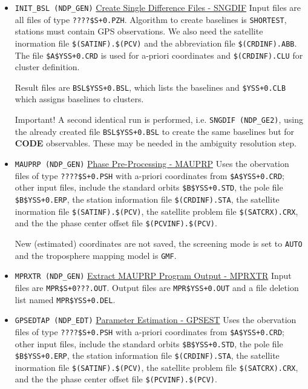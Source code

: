 \begin{itemize}
  \item \texttt{INIT\_BSL (NDP\_GEN)} \underline{Create Single Difference Files - SNGDIF}
    Input files are all files of type \texttt{????\$S+0.PZH}. Algorithm to create
    baselines is \texttt{SHORTEST}, stations must contain GPS observations. We
    also need the satellite inormation file \texttt{\$(SATINF).\$(PCV)} and the
    abbreviation file \texttt{\$(CRDINF).ABB}. The file \texttt{\$A\$YSS+0.CRD} is used
    for a-priori coordinates and \texttt{\$(CRDINF).CLU} for cluster definition.

    Result files are \texttt{BSL\$YSS+0.BSL}, which lists the baselines and
    \texttt{\$YSS+0.CLB} which assigns baselines to clusters.

    \begin{bclogo}[logo=\bcattention, couleurBarre=red, noborder=true, couleur=Peach]{Important!}
      A second identical run is performed, i.e. \texttt{SNGDIF (NDP\_GE2)}, using
      the already created file \texttt{BSL\$YSS+0.BSL} to create the same baselines
      but for \textbf{CODE} observables. These may be needed in the ambiguity
      resolution step.
    \end{bclogo}

  \item \texttt{MAUPRP (NDP\_GEN)} \underline{Phase Pre-Processing - MAUPRP}
    Uses the obervation files of type \texttt{????\$S+0.PSH} with a-priori coordinates
    from \texttt{\$A\$YSS+0.CRD}; other input files, include the standard orbits
    \texttt{\$B\$YSS+0.STD}, the pole file \texttt{\$B\$YSS+0.ERP}, the station
    information file \texttt{\$(CRDINF).STA}, the satellite inormation file
    \texttt{\$(SATINF).\$(PCV)}, the satellite problem file \texttt{\$(SATCRX).CRX},
    and the the phase center offset file \texttt{\$(PCVINF).\$(PCV)}.

    New (estimated) coordinates are not saved, the screening mode is set to
    \texttt{AUTO} and the troposphere mapping model is \texttt{GMF}.

  \item \texttt{MPRXTR (NDP\_GEN)} \underline{Extract MAUPRP Program Output - MPRXTR}
    Input files are \texttt{MPR\$S+0???.OUT}. Output files are \texttt{MPR\$YSS+0.OUT}
    and a file deletion list named \texttt{MPR\$YSS+0.DEL}.

  \item \texttt{GPSEDTAP (NDP\_EDT)} \underline{Parameter Estimation - GPSEST}
    Uses the obervation files of type \texttt{????\$S+0.PSH} with a-priori coordinates
    from \texttt{\$A\$YSS+0.CRD}; other input files, include the standard orbits
    \texttt{\$B\$YSS+0.STD}, the pole file \texttt{\$B\$YSS+0.ERP}, the station
    information file \texttt{\$(CRDINF).STA}, the satellite inormation file
    \texttt{\$(SATINF).\$(PCV)}, the satellite problem file \texttt{\$(SATCRX).CRX},
    and the the phase center offset file \texttt{\$(PCVINF).\$(PCV)}.


\end{itemize}
